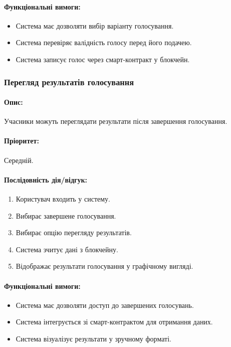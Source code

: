 \documentclass[14pt]{extreport}
\newcounter{req}[subsubsection]
\newcommand\req{\arabic{req}\stepcounter{req}}
\begin{document}
  \paragraph{Функціональні вимоги:}  
  \begin{itemize}[leftmargin=*,label=REQ-.\req:]  
      \item Система має дозволяти вибір варіанту голосування.  
      \item Система перевіряє валідність голосу перед його подачею.  
      \item Система записує голос через смарт-контракт у блокчейн.  
  \end{itemize}  

  \subsubsection{Перегляд результатів голосування}  
  \paragraph{Опис:} Учасники можуть переглядати результати після завершення голосування.  
  \paragraph{Пріоритет:} Середній.  
  \paragraph{Послідовність дія/відгук:}  
  \begin{enumerate}  
      \item Користувач входить у систему.  
      \item Вибирає завершене голосування.  
      \item Вибирає опцію перегляду результатів.  
      \item Система зчитує дані з блокчейну.  
      \item Відображає результати голосування у графічному вигляді.  
  \end{enumerate}  
  \paragraph{Функціональні вимоги:}  
  \begin{itemize}[leftmargin=*,label=REQ-.\req:]  
      \item Система має дозволяти доступ до завершених голосувань.  
      \item Система інтегрується зі смарт-контрактом для отримання даних.  
      \item Система візуалізує результати у зручному форматі.
  \end{itemize}  
\end{document}
